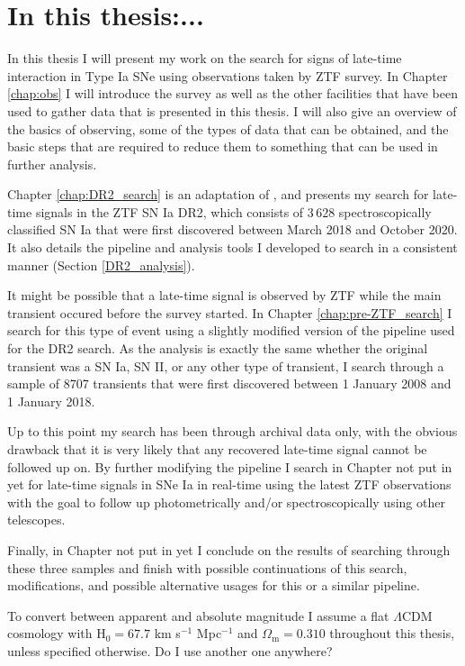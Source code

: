 \documentclass[a4paper,oneside,12pt, class=Latex/Classes/PhDthesisPSnPDF, crop=false]{standalone}
\begin{document}
\section{In this thesis:...}
In this thesis I will present my work on the search for signs of late-time interaction in Type Ia SNe using observations taken by ZTF survey. In Chapter \ref{chap:obs} I will introduce the survey as well as the other facilities that have been used to gather data that is presented in this thesis. I will also give an overview of the basics of observing, some of the types of data that can be obtained, and the basic steps that are required to reduce them to something that can be used in further analysis.

Chapter \ref{chap:DR2_search} is an adaptation of \cite{Terwel_2024_paper1}, and presents my search for late-time signals in the ZTF SN Ia DR2, which consists of $3\,628$ spectroscopically classified SN Ia that were first discovered between March 2018 and October 2020. It also details the pipeline and analysis tools I developed to search in a consistent manner (Section \ref{DR2_analysis}).

It might be possible that a late-time signal is observed by ZTF while the main transient occured before the survey started. In Chapter \ref{chap:pre-ZTF_search} I search for this type of event using a slightly modified version of the pipeline used for the DR2 search. As the analysis is exactly the same whether the original transient was a SN Ia, SN II, or any other type of transient, I search through a sample of 8707 transients that were first discovered between 1 January 2008 and 1 January 2018.

Up to this point my search has been through archival data only, with the obvious drawback that it is very likely that any recovered late-time signal cannot be followed up on. By further modifying the pipeline I search in Chapter \color{red} not put in yet \color{black} for late-time signals in SNe Ia in real-time using the latest ZTF observations with the goal to follow up photometrically and/or spectroscopically using other telescopes.

Finally, in Chapter \color{red} not put in yet \color{black} I conclude on the results of searching through these three samples and finish with possible continuations of this search, modifications, and possible alternative usages for this or a similar pipeline.

To convert between apparent and absolute magnitude I assume a flat $\Lambda$CDM cosmology with H$_0 = 67.7$ km s$^{-1}$ Mpc$^{-1}$ and $\Omega_\text{m} = 0.310$ \citep{Planck18VI} throughout this thesis, unless specified otherwise. \color{red} Do I use another one anywhere? \color{black}
\end{document}
